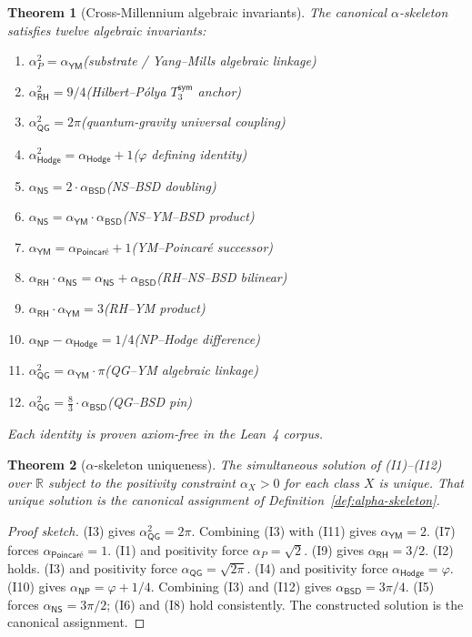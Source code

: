 \documentclass[11pt,a4paper]{amsart}
\theoremstyle{plain}
\newtheorem{theorem}{Theorem}[section]
\theoremstyle{definition}
\begin{document}
\begin{theorem}[Cross-Millennium algebraic invariants]\label{thm:invariants}
The canonical $\alpha$-skeleton satisfies twelve algebraic invariants:
\begin{enumerate}[label=\textup{(I\arabic*)},itemsep=2pt,leftmargin=2.5em]
\item $\alpha_{P}^2 = \alpha_{\textsf{YM}}$\hfill (substrate / Yang--Mills algebraic linkage)
\item $\alpha_{\textsf{RH}}^2 = 9/4$\hfill (Hilbert--P\'olya $T_3^{\textsf{sym}}$ anchor)
\item $\alpha_{\textsf{QG}}^2 = 2\pi$\hfill (quantum-gravity universal coupling)
\item $\alpha_{\textsf{Hodge}}^2 = \alpha_{\textsf{Hodge}} + 1$\hfill ($\varphi$ defining identity)
\item $\alpha_{\textsf{NS}} = 2\cdot\alpha_{\textsf{BSD}}$\hfill (NS--BSD doubling)
\item $\alpha_{\textsf{NS}} = \alpha_{\textsf{YM}}\cdot\alpha_{\textsf{BSD}}$\hfill (NS--YM--BSD product)
\item $\alpha_{\textsf{YM}} = \alpha_{\textsf{Poincar\'e}} + 1$\hfill (YM--Poincar\'e successor)
\item $\alpha_{\textsf{RH}}\cdot\alpha_{\textsf{NS}} = \alpha_{\textsf{NS}} + \alpha_{\textsf{BSD}}$\hfill (RH--NS--BSD bilinear)
\item $\alpha_{\textsf{RH}}\cdot\alpha_{\textsf{YM}} = 3$\hfill (RH--YM product)
\item $\alpha_{\textsf{NP}} - \alpha_{\textsf{Hodge}} = 1/4$\hfill (NP--Hodge difference)
\item $\alpha_{\textsf{QG}}^2 = \alpha_{\textsf{YM}}\cdot\pi$\hfill (QG--YM algebraic linkage)
\item $\alpha_{\textsf{QG}}^2 = \tfrac{8}{3}\cdot\alpha_{\textsf{BSD}}$\hfill (QG--BSD pin)
\end{enumerate}
Each identity is proven axiom-free in the Lean~4 corpus.
\end{theorem}

\begin{theorem}[$\alpha$-skeleton uniqueness]\label{thm:alpha-unique}
The simultaneous solution of \textup{(I1)--(I12)} over $\mathbb{R}$ subject to the positivity constraint $\alpha_X > 0$ for each class $X$ is unique. That unique solution is the canonical assignment of Definition~\ref{def:alpha-skeleton}.
\end{theorem}

\begin{proof}[Proof sketch]
(I3) gives $\alpha_{\textsf{QG}}^2 = 2\pi$. Combining (I3) with (I11) gives $\alpha_{\textsf{YM}}=2$. (I7) forces $\alpha_{\textsf{Poincar\'e}}=1$. (I1) and positivity force $\alpha_{P}=\sqrt{2}$. (I9) gives $\alpha_{\textsf{RH}}=3/2$. (I2) holds. (I3) and positivity force $\alpha_{\textsf{QG}}=\sqrt{2\pi}$. (I4) and positivity force $\alpha_{\textsf{Hodge}}=\varphi$. (I10) gives $\alpha_{\textsf{NP}}=\varphi+1/4$. Combining (I3) and (I12) gives $\alpha_{\textsf{BSD}}=3\pi/4$. (I5) forces $\alpha_{\textsf{NS}}=3\pi/2$; (I6) and (I8) hold consistently. The constructed solution is the canonical assignment.
\end{proof}
\end{document}
